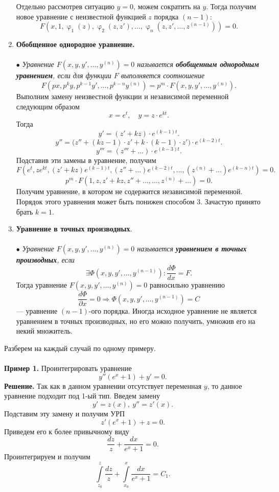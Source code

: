 \documentclass[a4paper, 12pt]{report}
\newcommand{\FI}{\Phi}
\renewcommand{\varphi}{\upvarphi}
\renewcommand{\d}{\partial}
\begin{document}
\begin{enumerate}
		Отдельно рассмотрев ситуацию $y= 0 $, можем сократить на $y$. Тогда получим новое уравнение с неизвестной функцией $z$ порядка $(n-1)$:$$F(x,1, \varphi_1(z), \varphi_2(z,z'),\ldots, \varphi_n(z,z',\ldots, z^{(n-1)})) = 0.$$ 
		\item \textbf{Обобщенное однородное уравнение.}\\\\
		$\bullet$ \textit{Уравнение $F(x, y, y',\ldots, y^{(n)}) = 0$ называется \textbf{обобщенным однородным уравнением}, если для функции $F$ выполняется соотношение} $$F(px, p^ky , p^{k-1}y',\ldots, p^{k-n}y^{(n)}) = p^m\cdot F(x, y, y',\ldots, y^{(n)}).$$
		Выполним замену неизвестной функции и независимой переменной следующим образом $$x = e^t,\quad y = z\cdot e^{kt}.$$
		Тогда $$y' = (z' + kz)\cdot e^{(k-1)t}.$$
$$
			y''  = \Big(z'' + (kz - 1)\cdot z' + k\cdot (k-1)\cdot z'\Big)\cdot e^{(k-2)t}.
$$
		$$y''' = (z''' + \ldots)\cdot e^{(k-3)t}.$$
		Подставив эти замены в уравнение, получим $$F(e^t, ze^{kt}, (z'+kz)e^{(k-1)t}, (z'' + \ldots)e^{(k-2)t},\ldots, (z^{(n)}+\ldots)e^{(k-n)t}) = 0.$$
		$$p^m \cdot F(1,z, z'+kz, z'' + \ldots, \ldots, z^{(n)}+\ldots) = 0.$$
		Получим уравнение, в котором не содержится независимой переменной. Порядок этого уравнения может быть понижен способом 3. Зачастую принято брать $k=1$.
		\item \textbf{Уравнение в точных производных}.\\\\
		$\bullet$ \textit{Уравнение $F(x, y, y',\ldots, y^{(n)}) = 0$ называется \textbf{уравнением в точных производных}, если $$\exists \FI(x,y,y',\ldots, y^{(n-1)}) : \dfrac{d \FI}{d x} = F.$$}
		Тогда уравнение $F(x, y, y',\ldots, y^{(n)}) = 0$ равносильно уравнению $$\dfrac{d \FI}{\d x}= 0 \Rightarrow \FI(x,y,y', \ldots, y^{(n-1)}) = C$$
		--- уравнение $(n-1)$-ого порядка.
		Иногда исходное уравнение не является уравнением в точных производных, но его можно получить, умножив его на некий множитель.
	\end{enumerate}
Разберем на каждый случай по одному примеру.\\\\
\textbf{Пример 1.} Проинтегрировать уравнение $$y'' (e^x + 1) + y' = 0.$$
\textbf{Решение.} Так как в данном уравнении отсутствует переменная $y$, то данное уравнение подходит под 1-ый тип. Введем замену $$y' = z(x),\ y'' = z'(x).$$
Подставим эту замену и получим УРП $$z'(e^x + 1) + z = 0.$$
Приведем его к более привычному виду $$\dfrac{dz}{z} + \dfrac{dx}{e^x + 1} = 0.$$
Проинтегрируем и получим $$\int\limits_{z_0}^z \dfrac{dz}{z} + \int\limits_{x_0}^x\dfrac{dx}{e^x + 1} = C_1.$$
\end{document}
